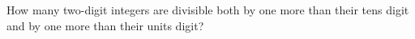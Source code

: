 How many two-digit integers are divisible both by one more than their tens digit and by one more than their units digit?
